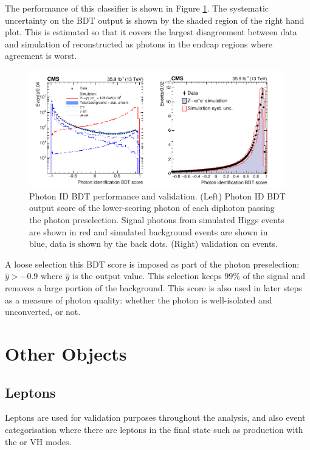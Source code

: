 The performance of this classifier is shown in Figure \ref{fig:object_reco:photon_id_bdt}. 
The systematic uncertainty on the BDT output is shown by the shaded region of the right hand plot. This is estimated so that it covers the largest disagreement between data and simulation of \Zee reconstructed as photons in the endcap regions where agreement is worst.
\begin{figure}[h!]
    \centering
    \includegraphics[width=0.99\textwidth]{figures/object_reco/CMS-HIG-16-040_Figure_002.pdf}
    \caption{Photon ID BDT performance and validation. (Left) Photon ID BDT output score of the lower-scoring photon of each diphoton passing the photon preselection. Signal photons from simulated Higgs events are shown in red and simulated background events are shown in blue, data is shown by the back dots. (Right) validation on \Zee events.}
        \label{fig:object_reco:photon_id_bdt}
\end{figure}

A loose selection this BDT score is imposed as part of the photon preselection: $\hat{y} > -0.9$ where $\hat{y}$ is the output value. This selection keeps $99\%$ of the signal and removes a large portion of the background. This score is also used in later steps as a measure of photon quality: whether the photon is well-isolated and unconverted, or not. 


\section{Other Objects}

\subsection{Leptons}
Leptons are used for validation purposes throughout the analysis, and also event categorisation where there are leptons in the final state such as production with the \ttH or VH modes. 
